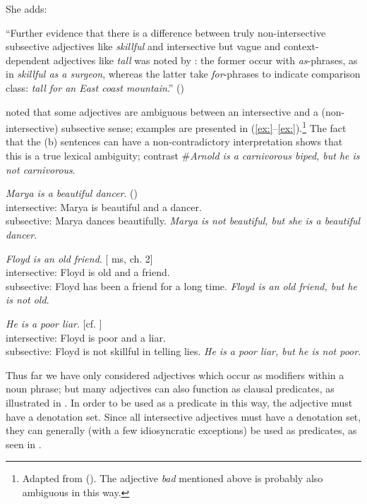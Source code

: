 She adds:


“Further evidence that there is a difference between truly non-intersective subsective adjectives like \textit{skillful} and intersective but vague and context-dependent adjectives like \textit{tall} was noted by \citet{Siegel1976}: the former occur with \textit{as}-phrases, as in \textit{skillful as a surgeon}, whereas the latter take \textit{for}-phrases to indicate comparison class: \textit{tall for an East coast mountain}.” (\citealt{Partee2007})


\citet{Bolinger1967} noted that some adjectives are ambiguous between an intersective and a (non-intersective) subsective sense; examples are presented in (\ref{ex:}--\ref{ex:}).\footnote{Adapted from \citealt{Morzycki2013} (). The adjective \textit{bad} mentioned above is probably also ambiguous in this way.} The fact that the (b) sentences can have a non-contradictory interpretation shows that this is a true lexical ambiguity; contrast \#\textit{Arnold is a carnivorous biped, but he is not carnivorous}.


\ea
\ea  \textit{Marya is a beautiful dancer}.   (\citealt{Siegel1976})\\
intersective: Marya is beautiful and a dancer.\\
subsective: Marya dances beautifully.
\ex  \textit{Marya is not beautiful, but she is a beautiful dancer}.
\z \z

\ea
\ea \textit{Floyd is an old friend}.   [\citealt{Morzycki2013} ms, ch. 2]\\
intersective: Floyd is old and a friend.\\
subsective: Floyd has been a friend for a long time.
\ex  \textit{Floyd is an old friend, but he is not old}.
\z \z

\ea
\ea  \textit{He is a poor liar}.   [cf. \citealt{Bolinger1967}]\\
intersective: Floyd is poor and a liar.\\
subsective: Floyd is not skillful in telling lies.
\ex  \textit{He is a poor liar, but he is not poor}.
\z \z


Thus far we have only considered adjectives which occur as modifiers within a noun phrase; but many adjectives can also function as clausal predicates, as illustrated in . In order to be used as a predicate in this way, the adjective must have a denotation set. Since all intersective adjectives must have a denotation set, they can generally (with a few idiosyncratic exceptions) be used as predicates, as seen in .



